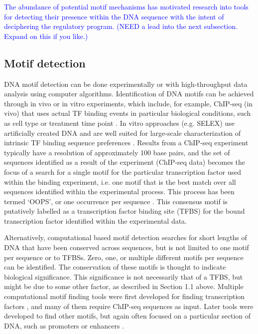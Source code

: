\documentclass[12pt]{article}
\begin{document}
\textcolor{blue}{The abundance of potential motif mechanisms has motivated research into tools for detecting their presence within the DNA sequence with the intent of deciphering the regulatory program. (NEED a lead into the next subsection. Expand on this if you like.)}

\subsection{Motif detection}
DNA motif detection can be done experimentally or with high-throughput data analysis using computer algorithms. Identification of DNA motifs can be achieved through in vivo or in vitro experiments, which include, for example, ChIP-seq (in vivo) that uses actual TF binding events in particular biological conditions, such as cell type or treatment time point \citep{inukai2017transcription}. In vitro approaches (e.g. SELEX) use artificially created DNA and are well suited for large-scale characterization of intrinsic TF binding sequence preferences \citep{inukai2017transcription}.  Results from a ChIP-seq experiment typically have a resolution of approximately 100 base pairs, and the set of sequences identified as a result of the experiment (ChIP-seq data) becomes the focus of a search for a single motif for the particular transcription factor used within the binding experiment, i.e. one motif that is the best match over all sequences identified within the experimental process. This process has been termed `OOPS', or one occurrence per sequence \citep{zhang2016entropy}. This consensus motif is putatively labelled as a transcription factor binding site (TFBS) for the bound transcription factor identified within the experimental data. 

Alternatively, computational based motif detection searches for short lengths of DNA that have been conserved across sequences, but is not limited to one motif per sequence or to TFBSs. Zero, one, or multiple different motifs per sequence can be identified. The conservation of these motifs is thought to indicate biological significance. This significance is not necessarily that of a TFBS, but might be due to some other factor, as described in Section 1.1 above. 
Multiple computational motif finding tools were first developed for finding transcription factors \citep{dassi2016dynamit}, and many of them require ChIP-seq sequences as input. Later tools were developed to find other motifs, but again often focused on a particular section of DNA, such as promoters or enhancers  \citep{boeva2016analysis}.
\end{document}
